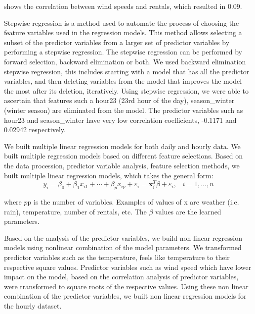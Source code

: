 \documentclass[12pt]{article}
\newcommand{\figwidth}{5in}
\begin{document}
 shows the correlation between wind speeds and
rentals, which resulted in $0.09$.

\ddfigure{\figwidth}{wind-count-cor}{Correlation of Wind Speed and Rentals}



Stepwise regression is a method used to automate the process of choosing the
feature variables used in the regression models. This method allows selecting a
subset of the predictor variables from a larger set of predictor variables by
performing a stepwise regression. The stepwise regression can be performed by
forward selection, backward elimination or both. We used backward elimination
stepwise regression, this includes starting with a model that has all the
predictor variables, and then deleting variables from the model that improves
the model the most after its deletion, iteratively.  Using stepwise regression,
we were able to ascertain that features such a hour23 (23rd hour of the day),
season\_winter (winter season) are eliminated from the model. The predictor
variables such as hour23 and season\_winter have very low correlation
coefficients, -0.1171 and 0.02942 respectively.





We built multiple linear regression models for both daily and hourly data. We
built multiple regression models based on different feature selections.  Based
on the data procession, predictor variable analysis, feature selection methods,
we built multiple linear regression models, which takes the general form:
\begin{equation}
y_i = \beta_0 + \beta_1x_{i1} + \cdots + \beta_px_{ip} + \varepsilon_i = {\mathbf
x}_i^{T}\beta + \varepsilon_i, \; \; \; i = 1, \ldots, n
\end{equation}

where $p$p is the number of variables. Examples of values of x are weather
(i.e. rain), temperature, number of rentals, etc. The $\beta$ values are the
learned parameters.



Based on the analysis of the predictor variables, we build non linear
regression models using nonlinear combination of the model parameters. We
transformed predictor variables such as the temperature, feels like temperature
to their respective square values. Predictor variables such as wind speed which
have lower impact on the model, based on the correlation analysis of predictor
variables, were transformed to square roots of the respective values.  Using
these non linear combination of the predictor variables, we built non linear
regression models for the hourly dataset.
\end{document}

